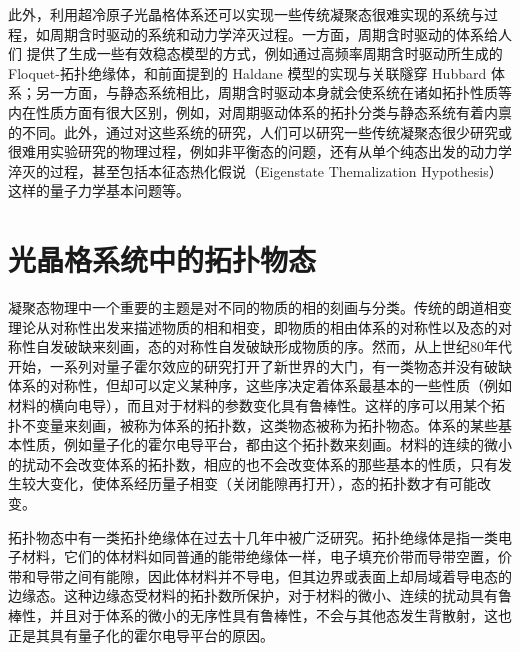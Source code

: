 
此外，利用超冷原子光晶格体系还可以实现一些传统凝聚态很难实现的系统与过程，如周期含时驱动的系统和动力学淬灭过程。一方面，周期含时驱动的体系给人们 提供了生成一些有效稳态模型的方式，例如通过高频率周期含时驱动所生成的 Floquet-拓扑绝缘体\cite{floq-ti-2011}，和前面提到的 Haldane 模型的实现\cite{haldane-expr-2014}与关联隧穿 Hubbard 体系\cite{floq-hubb-expr-2018,correlated-tunnel-expr-2018-shaking}；另一方面，与静态系统相比，周期含时驱动本身就会使系统在诸如拓扑性质等内在性质方面有很大区别，例如，对周期驱动体系的拓扑分类与静态系统有着内禀的不同\cite{floq-edgestate-2013-prx}。此外，通过对这些系统的研究，人们可以研究一些传统凝聚态很少研究或很难用实验研究的物理过程，例如非平衡态的问题，还有从单个纯态出发的动力学淬灭的过程，甚至包括本征态热化假说（Eigenstate Themalization Hypothesis）\cite{thermalize-entropy-2016}这样的量子力学基本问题等。




\section{光晶格系统中的拓扑物态}


凝聚态物理中一个重要的主题是对不同的物质的相的刻画与分类。传统的朗道相变理论从对称性出发来描述物质的相和相变，即物质的相由体系的对称性以及态的对称性自发破缺来刻画，态的对称性自发破缺形成物质的序。然而，从上世纪80年代开始，一系列对量子霍尔效应的研究打开了新世界的大门，有一类物态并没有破缺体系的对称性，但却可以定义某种序，这些序决定着体系最基本的一些性质（例如材料的横向电导），而且对于材料的参数变化具有鲁棒性。这样的序可以用某个拓扑不变量来刻画，被称为体系的拓扑数，这类物态被称为拓扑物态。体系的某些基本性质，例如量子化的霍尔电导平台，都由这个拓扑数来刻画。材料的连续的微小的扰动不会改变体系的拓扑数，相应的也不会改变体系的那些基本的性质，只有发生较大变化，使体系经历量子相变（关闭能隙再打开），态的拓扑数才有可能改变。

拓扑物态中有一类拓扑绝缘体在过去十几年中被广泛研究\cite{topo2010hasan}。拓扑绝缘体是指一类电子材料，它们的体材料如同普通的能带绝缘体一样，电子填充价带而导带空置，价带和导带之间有能隙，因此体材料并不导电，但其边界或表面上却局域着导电态的边缘态。这种边缘态受材料的拓扑数所保护，对于材料的微小、连续的扰动具有鲁棒性，并且对于体系的微小的无序性具有鲁棒性，不会与其他态发生背散射，这也正是其具有量子化的霍尔电导平台的原因。

